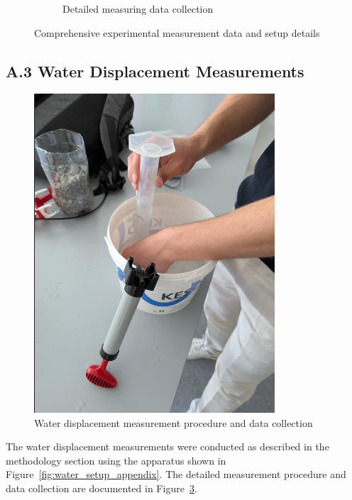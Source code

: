 \documentclass[12pt,a4paper]{article}
\begin{document}
\begin{figure}[H]
\begin{subfigure}{0.45\textwidth}
    \caption{Detailed measuring data collection}
    \label{fig:data_measurements_appendix}
\end{subfigure}
\caption{Comprehensive experimental measurement data and setup details}
\label{fig:raw_measurements_appendix}
\end{figure}

\subsection{A.3 Water Displacement Measurements}

\begin{figure}[H]
\centering
\includegraphics[width=0.8\textwidth]{measuring water sicplacment appendix.png}
\caption{Water displacement measurement procedure and data collection}
\label{fig:water_displacement_appendix}
\end{figure}

The water displacement measurements were conducted as described in the methodology section using the apparatus shown in Figure~\ref{fig:water_setup_appendix}. The detailed measurement procedure and data collection are documented in Figure~\ref{fig:water_displacement_appendix}.
\end{document}
